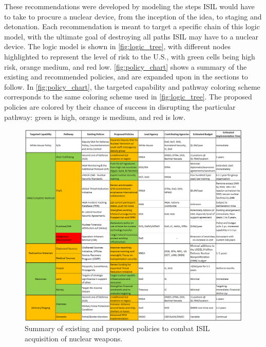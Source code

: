 \documentclass{report}
\begin{document}
These recommendations were developed by modeling the steps ISIL would have to take to procure a nuclear device, from the inception of the idea, to staging and detonation. Each recommendation is meant to target a specific chain of this logic model, with the ultimate goal of destroying all paths ISIL may have to a nuclear device. The logic model is shown in \autoref{fig:logic_tree}, with different nodes highlighted to represent the level of risk to the U.S., with green cells being high risk, orange medium, and red low. \autoref{fig:policy_chart} shows a summary of the existing and recommended policies, and are expanded upon in the sections to follow. In \autoref{fig:policy_chart}, the targeted capability and pathway coloring scheme corresponds to the same coloring scheme used in \autoref{fig:logic_tree}. The proposed policies are colored by their chance of success in disrupting the particular pathway: green is high, orange is medium, and red is low.








\begin{landscape}

\begin{figure}[H]
 \centering
 \includegraphics[trim = 0cm 0cm 0cm 0cm, clip,scale=0.52]{./figures/PolicyChart4.png}
   \caption{Summary of existing and proposed policies to combat ISIL acquisition of nuclear weapons.}
     \label{fig:policy_chart}
\end{figure}

\end{landscape}
\end{document}
